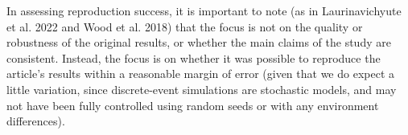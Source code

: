 In assessing reproduction success, it is important to note (as in Laurinavichyute et al. 2022\autocite{laurinavichyute_share_2022} and Wood et al. 2018\autocite{wood_push_2018}) that the focus is not on the quality or robustness of the original results, or whether the main claims of the study are consistent. Instead, the focus is on whether it was possible to reproduce the article's results within a reasonable margin of error (given that we do expect a little variation, since discrete-event simulations are stochastic models, and may not have been fully controlled using random seeds or with any environment differences).